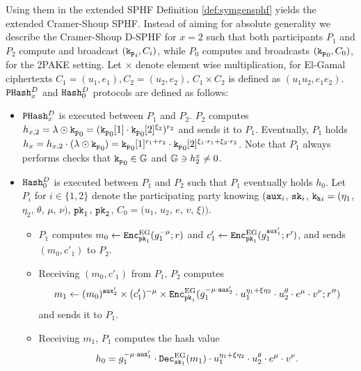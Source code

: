 \noindent
Using them in the extended \ac{SPHF} Definition \ref{def:symgensphf} yields the extended Cramer-Shoup \ac{SPHF}.
Instead of aiming for absolute generality we describe the Cramer-Shoup \ac{D-SPHF} for $x=2$ such that both participants $P_1$ and $P_2$ compute and broadcast $(\mathtt{k_p}_i,C_i)$, while $P_0$ computes and broadcasts $(\mathtt{k_p}_0,C_0)$, \ie for the \ac{2PAKE} setting.
Let $\times$ denote element wise multiplication, \eg for El-Gamal ciphertexts $C_1=(u_1,e_1), C_2=(u_2,e_2)$, $C_1\times C_2$ is defined as $(u_1u_2,e_1e_2)$.
$\mathtt{PHash}_x^D$ and $\mathtt{Hash}_0^D$ protocols are defined as follows:
\begin{itemize}
	\item $\mathtt{PHash}_x^D$ is executed between $P_1$ and $P_2$.
	$P_2$ computes $h_{x,2}=\lambda\odot\mathtt{k_p}_0=(\mathtt{k_p}_0[1]\cdot \mathtt{k_p}_0[2]^{\xi_2})^{r_2}$ and sends it to $P_1$.
	Eventually, $P_1$ holds $h_x=h_{x,2}\cdot (\lambda\odot\mathtt{k_p}_0)=\mathtt{k_p}_0[1]^{r_1+r_2}\cdot \mathtt{k_p}_0[2]^{\xi_1\cdot r_1+\xi_2\cdot r_2}$.
	Note that $P_1$ always performs checks that $\mathtt{k_p}_0\in\mathbb{G}$ and $\mathbb{G}\ni h_2^x\not=0$.
	
	\item $\mathtt{Hash}_0^D$ is executed between $P_1$ and $P_2$ such that $P_1$ eventually holds $h_0$.
	Let $P_i$ for $i\in\{1,2\}$ denote the participating party knowing $(\mathtt{aux}_i$, $\mathtt{sk}_i$, $\mathtt{k_h}_i=(\eta_1$, $\eta_2$, $\theta$, $\mu$, $\nu)$, $\mathtt{pk}_1$, $\mathtt{pk}_2$, $C_0=(u_1$, $u_2$, $e$, $v$, $\xi))$.
	\begin{itemize}
		\item $P_1$ computes $m_0\gets\mathtt{Enc}_{\mathtt{pk}_1}^{\mathrm{EG}}(g_1^{-\mu};r)$ and $c'_1\gets\mathtt{Enc}_{\mathtt{pk}_1}^{\mathrm{EG}}(g_1^{\mathtt{aux}'_1};r')$, and sends $(m_0,c'_1)$ to $P_2$.
	
		\item Receiving $(m_0,c'_1)$ from $P_1$, $P_2$ computes
				$$m_1\gets (m_0)^{\mathtt{aux}'_2}\times (c'_1)^{-\mu}\times \mathtt{Enc}_{\mathtt{pk}_1}^{\mathrm{EG}}(g_{1}^{-\mu\cdot \mathtt{aux}'_2}\cdot u_1^{\eta_1+\xi\eta_2}\cdot u_2^{\theta}\cdot e^{\mu}\cdot v^{\nu};r'')$$
				and sends it to $P_1$.
	
		\item Receiving $m_1$, $P_1$ computes the hash value
				$$h_0=g_1^{-\mu\cdot\mathtt{aux}'_1}\cdot\mathtt{Dec}_{\mathtt{sk}_1}^{\mathrm{EG}}(m_1)\cdot u_1^{\eta_1+\xi\eta_2}\cdot u_2^{\theta}\cdot e^{\mu}\cdot v^{\nu}.$$
	\end{itemize}
\end{itemize}

